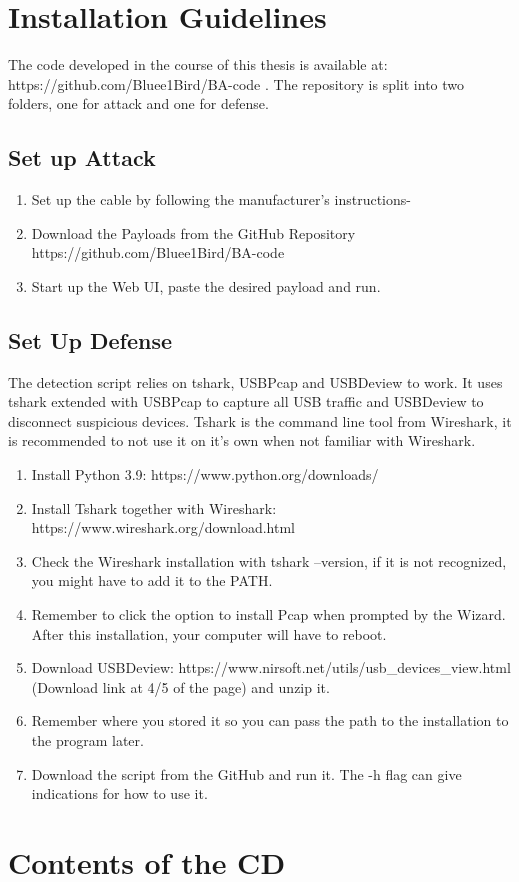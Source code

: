 \appendix

\chapter{Installation Guidelines}

The code developed in the course of this thesis is available at: \\ https://github.com/Bluee1Bird/BA-code .
The repository is split into two folders, one for attack and one for defense.

    
\section{Set up Attack}  

\begin{enumerate}
    \item Set up the cable by following the manufacturer's instructions-
    \item Download the Payloads from the GitHub Repository \\ https://github.com/Bluee1Bird/BA-code 
    \item Start up the Web UI, paste the desired payload and run. 
\end{enumerate}



\section{Set Up Defense}

The detection script relies on tshark, USBPcap and USBDeview to work. It uses tshark extended with USBPcap to capture all USB traffic and USBDeview to disconnect suspicious devices. Tshark is the command line tool from Wireshark, it is recommended to not use it on it's own when not familiar with Wireshark.

\begin{enumerate}
    \item Install Python 3.9: https://www.python.org/downloads/
    \item Install Tshark together with Wireshark: https://www.wireshark.org/download.html
    \item Check the Wireshark installation with tshark --version, if it is not recognized, you might have to add it to the PATH.
    \item Remember to click the option to install Pcap when prompted by the Wizard. After this installation, your computer will have to reboot.
    \item Download USBDeview: https://www.nirsoft.net/utils/usb\_devices\_view.html (Download link at 4/5 of the page) and unzip it.
    \item Remember where you stored it so you can pass the path to the installation to the program later.
    \item Download the script from the GitHub and run it. The -h flag can give indications for how to use it.
\end{enumerate}
    




\chapter{Contents of the CD}
